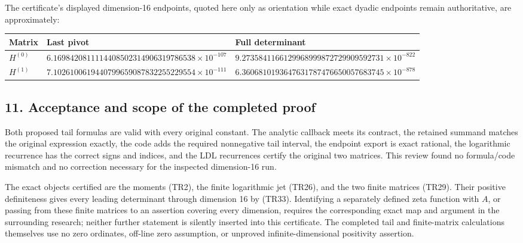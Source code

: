 The certificate's displayed dimension-16 endpoints, quoted here only as orientation while exact dyadic endpoints remain authoritative, are approximately:

{\scriptsize{} %
\begin{longtable}[]{@{}
  >{\raggedright\arraybackslash}p{}
  >{\raggedleft\arraybackslash}p{}
  >{\raggedleft\arraybackslash}p{}@{}}
\toprule\noalign{}
\begin{minipage}[b]{\linewidth}\raggedright
Matrix
\end{minipage} & \begin{minipage}[b]{\linewidth}\raggedleft
Last pivot
\end{minipage} & \begin{minipage}[b]{\linewidth}\raggedleft
Full determinant
\end{minipage} \\
\midrule\noalign{}
\endhead
\bottomrule\noalign{}
\endlastfoot
\(H^{(0)}\) & \(6.1698420811114408502314906319786538\times10^{-107}\) & \(9.2735841166129968999872729909592731\times10^{-822}\) \\
\(H^{(1)}\) & \(7.1026100619440799659087832255229554\times10^{-111}\) & \(6.3606810193647631787476650057683745\times10^{-878}\) \\
\end{longtable}
}

\subsection{11. Acceptance and scope of the completed proof}\label{acceptance-and-scope-of-the-completed-proof}

Both proposed tail formulas are valid with every original constant. The analytic callback meets its contract, the retained summand matches the original expression exactly, the code adds the required nonnegative tail interval, the endpoint export is exact rational, the logarithmic recurrence has the correct signs and indices, and the LDL recurrences certify the original two matrices. This review found no formula/code mismatch and no correction necessary for the inspected dimension-16 run.

The exact objects certified are the moments (TR2), the finite logarithmic jet (TR26), and the two finite matrices (TR29). Their positive definiteness gives every leading determinant through dimension 16 by (TR33). Identifying a separately defined zeta function with \(A\), or passing from these finite matrices to an assertion covering every dimension, requires the corresponding exact map and argument in the surrounding research; neither further statement is silently inserted into this certificate. The completed tail and finite-matrix calculations themselves use no zero ordinates, off-line zero assumption, or unproved infinite-dimensional positivity assertion.
